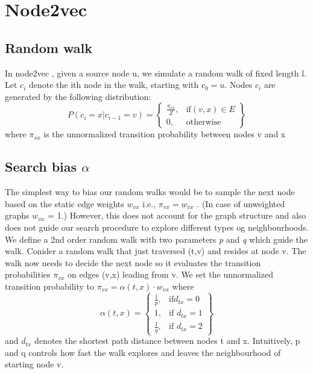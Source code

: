 \documentclass[review]{elsarticle}
\begin{document}
\section{Node2vec}
\subsection{Random walk}
\noindent In node2vec \cite{node2vec_paper}, given a source node u, we simulate a random walk of fixed length l. Let $c_{i}$  denote the ith node in the walk, starting with $c_{0} = u$. Nodes $c_{i}$ are generated by the following distribution:
\[
    P(c_{i}=x | c_{i-1} = v) = \left.
\begin{cases}
\frac{\pi_{vx}}{Z},& \text{if} (v,x) \in E\\
0,              & \text{otherwise}
\end{cases}
\right\}
\]
where $\pi_{vx}$ is the unnormalized transition probability between nodes v and x
\subsection{Search bias $\alpha$}
\noindent The simplest way to bias our random walks would be to sample the next node based on the static edge weights $w_{vx}$ i.e., $\pi_{vx} = w_{vx}$ . (In case of unweighted graphs $w_{vx}$ = 1.) However, this does not account for the graph structure and also does not guide our search procedure to explore different types og neighbourhoods. 
We define a 2nd order random walk with two parameters \textit{p} and \textit{q} which guide the walk. Conider a random walk that just traversed (t,v) and resides at node v. The walk now needs to decide the next node so it evaluates the transition probabilities $\pi_{vx}$ on edges (v,x) leading from v. We set the unnormalized transition probability to $\pi_{vx} = \alpha(t,x) \cdot w_{vx}$ where
\[
    \alpha(t,x) = \left\{\begin{array}{lr}
        \frac{1}{p}, & \text{if} d_{tx} = 0\\
        1, & \text{if } d_{tx} = 1\\
        \frac{1}{q}, & \text{if } d_{tx} = 2
        \end{array}\right\}
\]
and $d_{tx}$ denotes the shortest path distance between nodes t and x. Intuitively, p and q controls how fast the walk explores and leaves the neighbourhood of starting node v.
\end{document}
